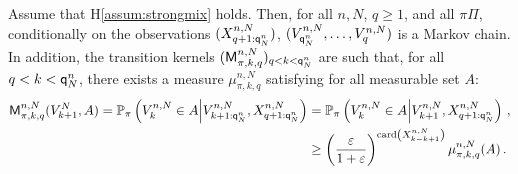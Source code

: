 \begin{lemma}
\label{lem:minorization}
Assume that H\ref{assum:strongmix} holds. Then, for all $n,N$, $q\ge 1$, and all $\pi\Pi$, conditionally on the observations $(X_{q+1:{\mathsf{q}}^{n}_{N}}^{n,N})$, $(V_{{\mathsf{q}}^{n}_{N}}^{n,N},\ldots,V_q^{n,N})$ is a Markov chain.
In addition,  the transition kernels $(\mathsf{M}^{n,N}_{\pi,k,q})_{q< k <{\mathsf{q}}^{n}_{N}}$ are such that, for all $q< k < {\mathsf{q}}^{n}_{N}$, there exists a measure $\mu^{n,N}_{\pi,k,q}$ satisfying for all measurable set $A$:
\begin{align*}
\mathsf{M}^{n,N}_{\pi,k,q}(V^N_{k+1},A) = \mathbb{P}_{\pi}\left(V^{n,N}_{k}\in A\middle|V^{n,N}_{k+1:{\mathsf{q}}^{n}_{N}},X_{q+1:{\mathsf{q}}^{n}_{N}}^{n,N}\right)  &= \mathbb{P}_{\pi}\left(V^{n,N}_{k}\in A\middle|V^{n,N}_{k+1},X_{q+1:{\mathsf{q}}^{n}_{N}}^{n,N}\right)\,,\\
&\ge \left(\frac{\varepsilon}{1+\varepsilon}\right)^{\mathrm{card}\left(X^{n,N}_{k- k+1}\right)} \mu^{n,N}_{\pi,k,q}(A)\,.
\end{align*}
\end{lemma}
